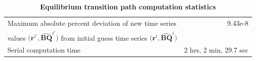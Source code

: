 \documentclass[letterpaper,12pt]{article}
\theoremstyle{definition}
\begin{document}
    \begin{table}[htbp] \centering \captionsetup{width=4.8in}
    \caption{\label{TabOGmodelTP}\textbf{Equilibrium transition path computation statistics}}
      \begin{threeparttable}
      \begin{tabular}{>{\small}l >{\small}r}
        \hline\hline
        Maximum absolute percent deviation of new time series & 9.43e-8 \\
        \quad values $\bigl(\bm{r}^{i'},\bm{\hat{BQ}}^{i'}\bigr)$ from initial guess time series $\bigl(\bm{r}^{i},\bm{\hat{BQ}}^{i}\bigr)$ &  \\[3mm]
        Serial computation time & 2 hrs, 2 min, 29.7 sec \\
        \hline\hline
      \end{tabular}
      \end{threeparttable}
    \end{table}
\end{document}

